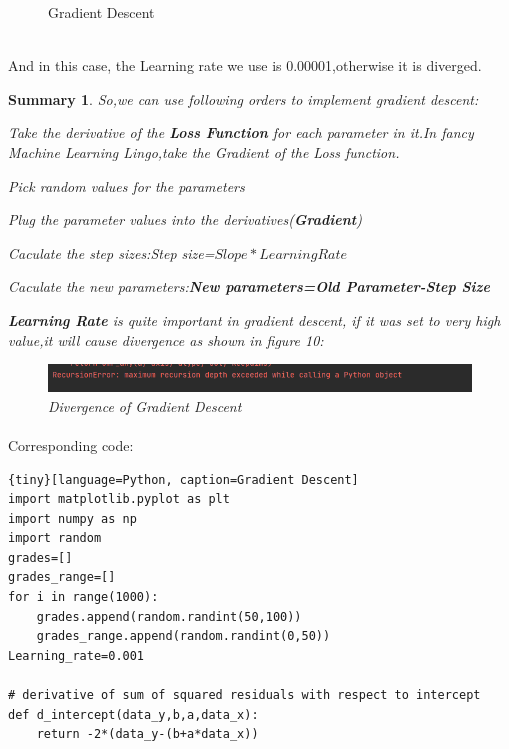 \documentclass[a4paper,12pt]{article}
\newtheorem{summary}{Summary}[section]
\begin{document}
\begin{spacing}{2}
\begin{figure}
\caption{Gradient Descent}
\label{Gradient Descent}
\end{figure}
\\And in this case, the Learning rate we use is 0.00001,otherwise it is diverged. 
\newpage
\begin{summary}
So,we can use following orders to implement gradient descent:
\begin{steps}
  \item Take the derivative of the \textbf{Loss Function} for each parameter in it.In fancy Machine Learning Lingo,take the Gradient of the Loss function.
  \item Pick random values for the parameters
  \item Plug the parameter values into the derivatives(\textbf{Gradient})
  \item Caculate the step sizes:Step size=$Slope*Learning Rate$
  \item Caculate the new parameters:\textbf{New parameters=Old Parameter-Step Size}
\end{steps}
\textbf{Learning Rate} is quite important in gradient descent, if it was set to very high value,it will cause divergence as shown in figure 10:
\begin{figure}
\centering
\includegraphics[scale=0.5]{Figure_10.png}
\caption{Divergence of Gradient Descent}
\label{Divegerence of Gradient Descent}
\end{figure}
\end{summary}
\paragraph{ }Corresponding code:
\begin{tiny}
\begin{lstlisting}{tiny}[language=Python, caption=Gradient Descent]
import matplotlib.pyplot as plt
import numpy as np
import random
grades=[]
grades_range=[]
for i in range(1000):
    grades.append(random.randint(50,100))
    grades_range.append(random.randint(0,50))
Learning_rate=0.001

# derivative of sum of squared residuals with respect to intercept
def d_intercept(data_y,b,a,data_x):
    return -2*(data_y-(b+a*data_x))


\end{lstlisting}
\end{tiny}
\end{spacing}
\end{document}
